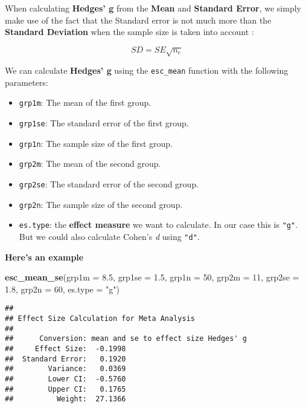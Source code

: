 \documentclass[]{book}
\newenvironment{Shaded}{\begin{snugshade}}{\end{snugshade}}
\newcommand{\KeywordTok}[1]{\textcolor[rgb]{0.13,0.29,0.53}{\textbf{#1}}}
\newcommand{\DataTypeTok}[1]{\textcolor[rgb]{0.13,0.29,0.53}{#1}}
\newcommand{\DecValTok}[1]{\textcolor[rgb]{0.00,0.00,0.81}{#1}}
\newcommand{\FloatTok}[1]{\textcolor[rgb]{0.00,0.00,0.81}{#1}}
\newcommand{\StringTok}[1]{\textcolor[rgb]{0.31,0.60,0.02}{#1}}
\newcommand{\NormalTok}[1]{#1}
\providecommand{\tightlist}{%
  \setlength{\itemsep}{0pt}\setlength{\parskip}{0pt}}
\theoremstyle{definition}
\theoremstyle{definition}
\theoremstyle{definition}
\theoremstyle{remark}
\begin{document}
When calculating \textbf{Hedges' g} from the \textbf{Mean} and
\textbf{Standard Error}, we simply make use of the fact that the
Standard error is not much more than the \textbf{Standard Deviation}
when the sample size is taken into account
\citep{thalheimer2002calculate}:

\[SD = SE\sqrt{n_c}\]

We can calculate \textbf{Hedges' g} using the \texttt{esc\_mean}
function with the following parameters:

\begin{itemize}
\tightlist
\item
  \texttt{grp1m}: The mean of the first group.
\item
  \texttt{grp1se}: The standard error of the first group.
\item
  \texttt{grp1n}: The sample size of the first group.
\item
  \texttt{grp2m}: The mean of the second group.
\item
  \texttt{grp2se}: The standard error of the second group.
\item
  \texttt{grp2n}: The sample size of the second group.
\item
  \texttt{es.type}: the \textbf{effect measure} we want to calculate. In
  our case this is \texttt{"g"}. But we could also calculate Cohen's
  \emph{d} using \texttt{"d"}.
\end{itemize}

\textbf{Here's an example}

\begin{Shaded}
\begin{Highlighting}[]
\KeywordTok{esc_mean_se}\NormalTok{(}\DataTypeTok{grp1m =} \FloatTok{8.5}\NormalTok{, }\DataTypeTok{grp1se =} \FloatTok{1.5}\NormalTok{, }\DataTypeTok{grp1n =} \DecValTok{50}\NormalTok{,}
  \DataTypeTok{grp2m =} \DecValTok{11}\NormalTok{, }\DataTypeTok{grp2se =} \FloatTok{1.8}\NormalTok{, }\DataTypeTok{grp2n =} \DecValTok{60}\NormalTok{, }\DataTypeTok{es.type =} \StringTok{"g"}\NormalTok{)}
\end{Highlighting}
\end{Shaded}

\begin{verbatim}
## 
## Effect Size Calculation for Meta Analysis
## 
##      Conversion: mean and se to effect size Hedges' g
##     Effect Size:  -0.1998
##  Standard Error:   0.1920
##        Variance:   0.0369
##        Lower CI:  -0.5760
##        Upper CI:   0.1765
##          Weight:  27.1366
\end{verbatim}
\end{document}
